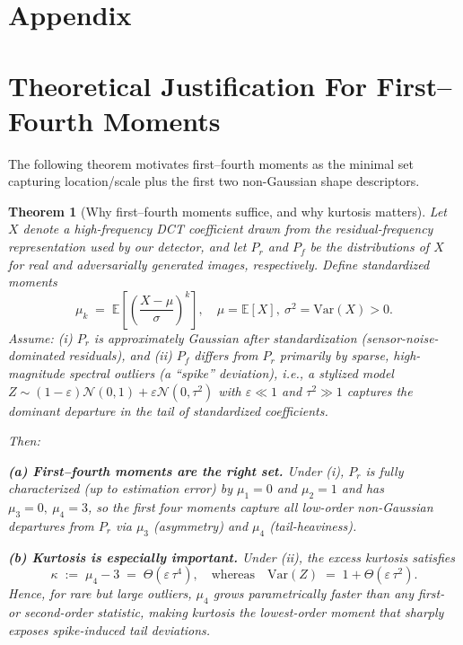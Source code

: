 \documentclass[letterpaper,twocolumn,10pt]{article}
\newtheorem{theorem}{Theorem}
\begin{document}


 


\appendix

\section*{Appendix}
\section{Theoretical Justification For First–Fourth Moments}
\label{sec:theory}
The following theorem motivates first–fourth moments as the minimal set capturing location/scale plus the first two non-Gaussian shape descriptors.
\begin{theorem}[Why first--fourth moments suffice, and why kurtosis matters]
\label{thm:why_first_fourth}
Let $X$ denote a high-frequency DCT coefficient drawn from the residual-frequency representation used by our detector,
and let $P_r$ and $P_f$ be the distributions of $X$ for real and adversarially generated images, respectively. Define standardized moments
\[
\mu_k \;=\; \mathbb{E}\!\left[\left(\frac{X-\mu}{\sigma}\right)^k\right],
\quad \mu=\mathbb{E}[X],\ \sigma^2=\mathrm{Var}(X)>0.
\]
Assume: (i) $P_r$ is approximately Gaussian after standardization (sensor-noise-dominated residuals), and
(ii) $P_f$ differs from $P_r$ primarily by sparse, high-magnitude spectral outliers (a ``spike'' deviation), i.e.,
a stylized model $Z\sim(1-\varepsilon)\mathcal{N}(0,1)+\varepsilon\mathcal{N}(0,\tau^2)$ with $\varepsilon\ll 1$ and $\tau^2\gg 1$
captures the dominant departure in the tail of standardized coefficients.

\noindent Then:

\noindent\textbf{(a) First--fourth moments are the right set.}
Under (i), $P_r$ is fully characterized (up to estimation error) by $\mu_1=0$ and $\mu_2=1$ and has $\mu_3=0,\ \mu_4=3$,
so the first four moments capture all low-order non-Gaussian departures from $P_r$ via $\mu_3$ (asymmetry) and $\mu_4$ (tail-heaviness).

\noindent\textbf{(b) Kurtosis is especially important.}
Under (ii), the excess kurtosis satisfies
\[
\kappa \;:=\; \mu_4-3 \;=\; \Theta(\varepsilon\,\tau^4),
\quad \text{whereas}\quad
\mathrm{Var}(Z) \;=\; 1+\Theta(\varepsilon\,\tau^2).
\]
Hence, for rare but large outliers, $\mu_4$ grows parametrically faster than any first- or second-order statistic,
making kurtosis the \emph{lowest-order} moment that sharply exposes spike-induced tail deviations.


\end{theorem}
\end{document}
